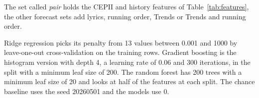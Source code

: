 The set called \emph{pair} holds the CEPII and history features of Table~\ref{tab:features}, the other forecast sets add lyrics, running order, Trends or Trends and running order.

Ridge regression picks its penalty from 13 values between 0.001 and 1000 by leave-one-out cross-validation on the training rows. Gradient boosting is the histogram version with depth 4, a learning rate of 0.06 and 300 iterations, in the split with a minimum leaf size of 200. The random forest has 200 trees with a minimum leaf size of 20 and looks at half of the features at each split. The chance baseline uses the seed 20260501 and the models use 0.
